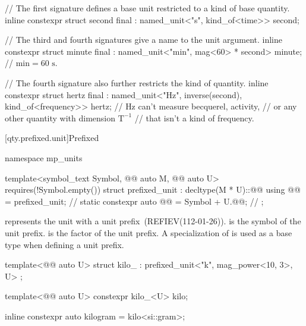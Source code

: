 \pnum
\begin{example}
\begin{codeblock}
// The first signature defines a base unit restricted to a kind of base quantity.
inline constexpr struct second final : named_unit<"s", kind_of<time>> {
} second;

// The third and fourth signatures give a name to the unit argument.
inline constexpr struct minute final : named_unit<"min", mag<60> * second> {
} minute;  // $\textrm{min} = 60 \textrm{ s}$.

// The fourth signature also further restricts the kind of quantity.
inline constexpr struct hertz final : named_unit<"Hz", inverse(second), kind_of<frequency>> {
} hertz;  // $\textrm{Hz}$ can't measure becquerel, activity,
          // or any other quantity with dimension $\textrm{T}^{-1}$
          // that isn't a kind of frequency.
\end{codeblock}
\end{example}

[qty.prefixed.unit]{Prefixed}

\begin{codeblock}
namespace mp_units {

template<symbol_text Symbol, @@ auto M, @@ auto U>
  requires(!Symbol.empty())
struct prefixed_unit : decltype(M * U)::@@ {
  using @@ = prefixed_unit;                   // \expos
  static constexpr auto @@ = Symbol + U.@@;  // \expos
};

}
\end{codeblock}

\pnum
{} represents the unit  with a unit prefix~(REFIEV(112-01-26)).
 is the symbol of the unit prefix.
 is the factor of the unit prefix.
A specialization of  is used as a base type when defining a unit prefix.
\begin{example}
\begin{codeblock}
template<@@ auto U>
struct kilo_ : prefixed_unit<"k", mag_power<10, 3>, U> {};

template<@@ auto U>
constexpr kilo_<U> kilo;

inline constexpr auto kilogram = kilo<si::gram>;
\end{codeblock}
\end{example}

